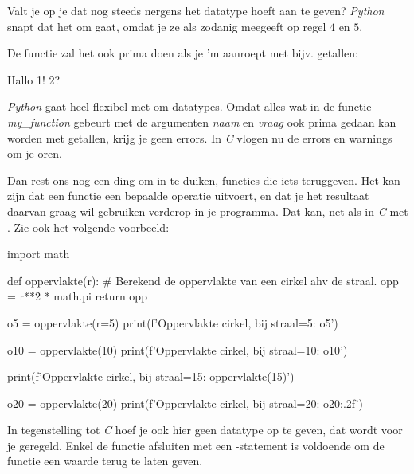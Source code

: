 Valt je op je dat nog steeds nergens het datatype hoeft aan te geven? \textit{Python} snapt dat het om  gaat, omdat je ze als zodanig meegeeft op regel $4$ en $5$. 

\begin{remark}
De functie zal het ook prima doen als je 'm aanroept met bijv. getallen: 

\begin{python}
Hallo 1! 2?
\end{python}
\textit{Python} gaat heel flexibel met om datatypes. Omdat alles wat in de functie \textit{my\_function} gebeurt met de argumenten \textit{naam} en \textit{vraag} ook prima gedaan kan worden met getallen, krijg je geen errors. In \textit{C} vlogen nu de errors en warnings om je oren.
\end{remark}

\newpage

Dan rest ons nog een ding om in te duiken, functies die iets teruggeven. Het kan zijn dat een functie een bepaalde operatie uitvoert, en dat je het resultaat daarvan graag wil gebruiken verderop in je programma. Dat kan, net als in \textit{C} met . Zie ook het volgende voorbeeld:

\begin{python}
import math 

def oppervlakte(r):
    # Berekend de oppervlakte van een cirkel ahv de straal.
    opp = r**2 * math.pi
    return opp

o5 = oppervlakte(r=5)
print(f'Oppervlakte cirkel, bij straal=5:  {o5}')

o10 = oppervlakte(10)
print(f'Oppervlakte cirkel, bij straal=10: {o10}')

print(f'Oppervlakte cirkel, bij straal=15: {oppervlakte(15)}')

o20 = oppervlakte(20)
print(f'Oppervlakte cirkel, bij straal=20: {o20:.2f}')
\end{python}

In tegenstelling tot \textit{C} hoef je ook hier geen datatype op te geven, dat wordt voor je geregeld. Enkel de functie afsluiten met een -statement is voldoende om de functie een waarde terug te laten geven. 

